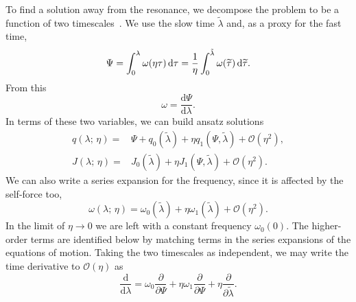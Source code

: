 \documentclass[aps,prd,amsfonts,amssymb,amsmath,nofootinbib,showpacs,superscriptaddress,twocolumn,floatfix]{revtex4-1}
\newcommand{\dd}{\ensuremath{\mathrm{d}}}
\newcommand{\diff}[2]{\ensuremath{\dfrac{\dd {#1}}{\dd {#2}}}}
\newcommand{\diffop}[1]{\ensuremath{\dfrac{\dd}{\dd {#1}}}}
\newcommand{\partialdiffop}[1]{\ensuremath{\dfrac{\partial}{\partial {#1}}}}
\newcommand{\recip}[1]{\ensuremath{\frac{1}{#1}}}
\newcommand{\intd}[4]{\ensuremath{\int_{#1}^{#2}{#3}\,\dd{#4}}}
\newcommand{\order}[1]{\ensuremath{\mathcal{O}({#1})}}
\begin{document}
To find a solution away from the resonance, we decompose the problem to be a function of two timescales~\cite{Kevorkian1971}. We use the slow time $\widetilde{\lambda}$ and, as a proxy for the fast time,
\begin{equation}
\Psi = \intd{0}{\lambda}{\omega(\eta\tau)}{\tau} = \recip{\eta}\intd{0}{\tilde{\lambda}}{\omega(\widetilde{\tau})}{\widetilde{\tau}}.
\vspace{0.000cm}
\end{equation}
From this
\begin{equation}
\omega = \diff{\Psi}{\lambda}.
\end{equation}
In terms of these two variables, we can build ansatz solutions
\begin{subequations}
\begin{align}
\label{eq:q-series}
q(\lambda;\,\eta) = {} & \Psi + q_0\left(\widetilde{\lambda}\right) + \eta q_1\left(\Psi,\widetilde{\lambda}\right) + \order{\eta^2}, \\
J(\lambda;\,\eta) = {} & J_0\left(\widetilde{\lambda}\right) + \eta J_1\left(\Psi,\widetilde{\lambda}\right) + \order{\eta^2}.
\label{eq:J-series}
\end{align}
\end{subequations}
We can also write a series expansion for the frequency, since it is affected by the self-force too,
\begin{equation}
\omega(\lambda;\,\eta) = \omega_0\left(\widetilde{\lambda}\right) + \eta \omega_1\left(\widetilde{\lambda}\right) + \order{\eta^2}.
\end{equation}
In the limit of $\eta \rightarrow 0$ we are left with a constant frequency $\omega_0(0)$. The higher-order terms are identified below by matching terms in the series expansions of the equations of motion. Taking the two timescales as independent, we may write the time derivative to $\order{\eta}$ as
\begin{equation}
\diffop{\lambda} = \omega_0\partialdiffop{\Psi} + \eta\omega_1\partialdiffop{\Psi} + \eta\partialdiffop{\widetilde{\lambda}}.
\end{equation}
\end{document}
